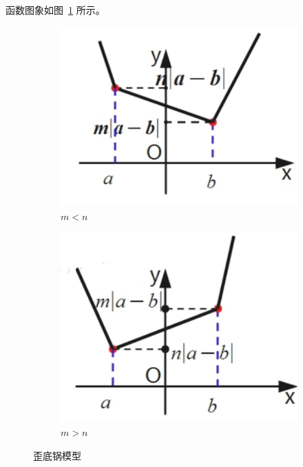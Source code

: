 \documentclass[a4paper,openany]{ctexbook}
\begin{document}
函数图象如图~\ref{fgr:wddigomoxk} 所示。
\begin{figure}
    \centering
    \begin{subfigure}{0.45\textwidth}
        \centering
        \includegraphics[width=\textwidth]{image20.png}
        \caption{\(m<n\)}
    \end{subfigure}
    \hfill
    \begin{subfigure}{0.45\textwidth}
        \centering
        \includegraphics[width=\textwidth]{image21.png}
        \caption{\(m>n\)}
    \end{subfigure}
    \caption{歪底锅模型}\label{fgr:wddigomoxk}
\end{figure}
\end{document}
